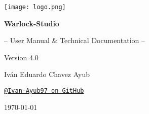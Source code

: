 \documentclass[11pt, a4paper]{article}
\begin{document}
\begin{titlepage}
    \begin{tcolorbox}[
        colback=WarlockDark,                    %
        colframe=WarlockGold,                   %
        sharp corners,                          %
        boxrule=1.5pt,                          %
        halign=center,                          %
        valign=center,                          %
        height=\dimexpr\textheight-1cm\relax    %
      ]
      \centering %

      \texttt{[image: logo.png]}\par %

      \vfill %

      \color{white} %

      {\Huge\bfseries Warlock-Studio\par}
      \vspace{0.7cm} %
      {\Large -- User Manual \& Technical Documentation --\par}
      \vspace{0.2cm}
      {\Large Version 4.0\par}

      \vfill %

      {\large Iván Eduardo Chavez Ayub\par}
      \href{https://github.com/Ivan-Ayub97}{\texttt{\color{WarlockGold}@Ivan-Ayub97 on GitHub}}\par %

      \vspace{1.5cm}

      {\large \today\par} %
    \end{tcolorbox}
    \thispagestyle{empty} %
\end{titlepage}


\pagestyle{fancy} %
\end{document}
